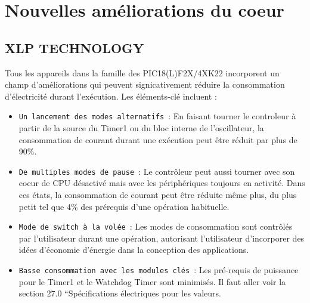 \documentclass[a4paper, 12pt]{book}
\begin{document}
\section{Nouvelles améliorations du coeur}
\subsection{XLP TECHNOLOGY}
Tous les appareils dans la famille des PIC18(L)F2X/4XK22 incorporent un champ d’améliorations qui peuvent signicativement réduire la consommation d’électricité durant l’exécution. 
Les éléments-clé incluent :
\begin{itemize}
\item \texttt{Un lancement des modes alternatifs}~:
En faisant tourner le controleur à partir de la source du Timer1 ou du bloc interne de l’oscillateur, la consommation de courant durant une exécution peut être réduit par plus de 90\%.
\item \texttt{De multiples modes de pause}~:
Le contrôleur peut aussi tourner avec son coeur de CPU désactivé mais avec les périphériques toujours en activité. Dans ces états, la consommation de courant peut être réduite même plus, du plus petit tel que 4\% des prérequis d’une opération habituelle.
\item \texttt{Mode de switch à la volée}~:
Les modes de consommation sont contrôlés par l’utilisateur durant une opération, autorisant l’utilisateur d’incorporer des idées d’économie d’énergie dans la conception des applications.
\item \texttt{Basse consommation avec les modules clés}~:
Les pré-requis de puissance pour le Timer1 et le Watchdog Timer sont minimisés. Il faut aller voir la section 27.0 “Spécifications électriques pour les valeurs.\\
\end{itemize}
\end{document}
